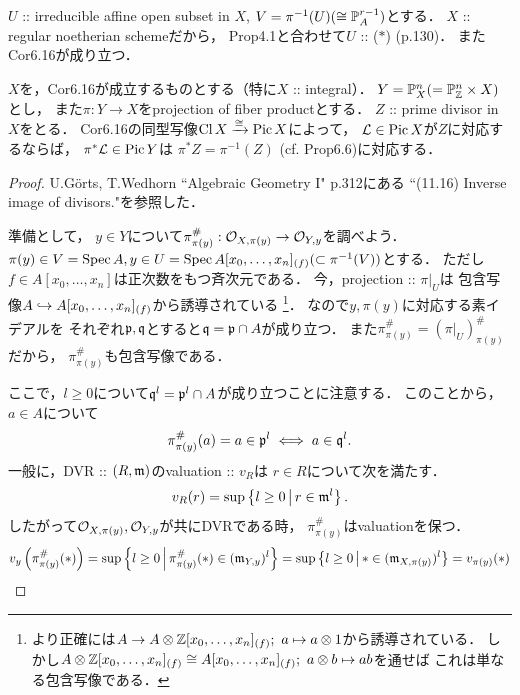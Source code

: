 \documentclass[a4paper]{jsarticle}
\newcommand{\Cl}{\operatorname{Cl}}
\newcommand{\Pic}{\operatorname{Pic}}
\begin{document}
    $U$ :: irreducible affine open subset in $X$, 
    $V=\pi^{-1}(U) (\cong \mathbb{P}_A^{r-1})$とする．
    $X$ :: regular noetherian schemeだから，
    Prop4.1と合わせて$U$ :: ($*$) (p.130)．
    またCor6.16が成り立つ．
    \begin{Claim}
        $X$を，Cor6.16が成立するものとする（特に$X$ :: integral）．
        $Y=\mathbb{P}^n_X(=\mathbb{P}^n_{\mathbb{Z}} \times X)$とし，
        また$\pi: Y \to X$をprojection of fiber productとする．
        $Z$ :: prime divisor in $X$をとる．
        Cor6.16の同型写像$\Cl X \isomap \Pic X$によって，
        $\shL \in \Pic X$が$Z$に対応するならば，
        $\pi^* \shL \in \Pic Y$は
        $\pi^* Z=\pi^{-1}(Z)$ (cf. Prop6.6)に対応する．
    \end{Claim}
    \begin{proof}
        U.G\"orts, T.Wedhorn ``Algebraic Geometry I" p.312にある
        ``(11.16) Inverse image of divisors."を参照した．

        準備として，
        $y \in Y$について$\pi^{\#}_{\pi(y)}: \mathcal{O}_{X, \pi(y)} \to \mathcal{O}_{Y, y}$を調べよう．
        $\pi(y) \in V=\operatorname{Spec} A, y \in U=\operatorname{Spec} A[x_0,\dots,x_n]_{(f)} (\subset \pi^{-1}(V))$とする．
        ただし$f \in A[x_0,\dots,x_n]$は正次数をもつ斉次元である．
        今，projection :: $\pi|_U$は
        包含写像$A \hookrightarrow A[x_0,\dots,x_n]_{(f)}$から誘導されている
        \footnote
        {
            より正確には$A \to A \otimes \mathbb{Z}[x_0,\dots,x_n]_{(f)};~ a \mapsto a \otimes 1$から誘導されている．
            しかし$A \otimes \mathbb{Z}[x_0,\dots,x_n]_{(f)} \cong A[x_0,\dots,x_n]_{(f)};~ a \otimes b \mapsto ab$を通せば
            これは単なる包含写像である．
        }．
        なので$y, \pi(y)$に対応する素イデアルを
        それぞれ$\mathfrak{p}, \mathfrak{q}$とすると$\mathfrak{q}=\mathfrak{p} \cap A$が成り立つ．
        また$\pi^{\#}_{\pi(y)}=(\pi|_U)^{\#}_{\pi(y)}$だから，
        $\pi^{\#}_{\pi(y)}$も包含写像である．

        ここで，$l \geq 0$について$\mathfrak{q}^{l}=\mathfrak{p}^{l} \cap A$が成り立つことに注意する．
        このことから，$a \in A$について
        \[ \pi^{\#}_{\pi(y)}(a)=a \in \mathfrak{p}^{l} \iff a \in \mathfrak{q}^{l}. \]
        一般に，DVR :: $(R, \mathfrak{m})$のvaluation :: $v_R$は
        $r \in R$について次を満たす．
        \[ v_R(r)=\sup \left\{ l \geq 0 \,\middle|\, r \in \mathfrak{m}^l \right\}. \]
        したがって$\mathcal{O}_{X, \pi(y)}, \mathcal{O}_{Y, y}$が共にDVRである時，
        $\pi^{\#}_{\pi(y)}$はvaluationを保つ．
        \[
            v_y \left( \pi^{\#}_{\pi(y)}(*) \right)
            =\sup \left\{ l \geq 0 \,\middle|\, \pi^{\#}_{\pi(y)}(*) \in (\mathfrak{m}_{Y,y})^l \right\}
            =\sup \left\{ l \geq 0 \,\middle|\, * \in (\mathfrak{m}_{X,\pi(y)})^l \right\}
            =v_{\pi(y)}(*)
        \]


\end{proof}
\end{document}
